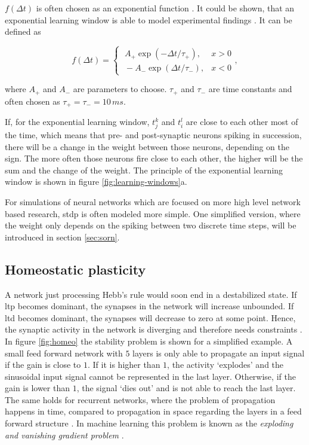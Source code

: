 $f(\Delta t)$ is often chosen as an exponential function \parencite{sjostrom2010spike}. It could be shown, that an exponential learning window is able to model experimental findings \parencite{zhang1998critical}. It can be defined as

\begin{equation}
f(\Delta t) = \begin{cases}
\;A_+ \exp(-\Delta t / \tau_+), & x > 0\\
\;-A_- \exp(\Delta t / \tau_-), & x < 0
\end{cases},
\end{equation}

where $A_+$ and $A_-$ are parameters to choose. $\tau_+$ and $\tau_-$ are time constants and often chosen as $\tau_+ = \tau_- = 10\,ms$.

If, for the exponential learning window, $t_j^k$ and $t_i^l$ are close to each other most of the time, which means that pre- and post-synaptic neurons spiking in succession, there will be a change in the weight between those neurons, depending on the sign. The more often those neurons fire close to each other, the higher will be the sum and the change of the weight. The principle of the exponential learning window is shown in figure \ref{fig:learning-windows}a.

For simulations of neural networks which are focused on more high level network based research, \ac{stdp} is often modeled more simple. One simplified version, where the weight only depends on the spiking between two discrete time steps, will be introduced in section \ref{sec:sorn}.

\subsection{Homeostatic plasticity}

A network just processing Hebb's rule would soon end in a destabilized state. If \acs{ltp} becomes dominant, the synapses in the network will increase unbounded. If \acs{ltd} becomes dominant, the synapses will decrease to zero at some point. Hence, the synaptic activity in the network is diverging and therefore needs constraints \parencite{miller1994role, abbott2000synaptic}. In figure \ref{fig:homeo} the stability problem is shown for a simplified example. A small feed forward network with $5$ layers is only able to propagate an input signal if the gain is close to $1$. If it is higher than $1$, the activity `explodes' and the sinusoidal input signal cannot be represented in the last layer. Otherwise, if the gain is lower than $1$, the signal `dies out' and is not able to reach the last layer. The same holds for recurrent networks, where the problem of propagation happens in time, compared to propagation in space regarding the layers in a feed forward structure \parencite{turrigiano2004homeostatic}. In machine learning this problem is known as the \emph{exploding and vanishing gradient problem} \parencite{pascanu2013difficulty}.


